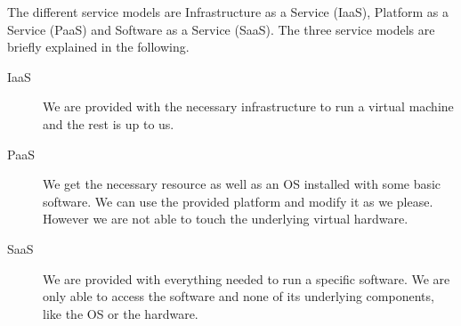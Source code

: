 The different service models are Infrastructure as a Service (IaaS),
Platform as a Service (PaaS) and Software as a Service (SaaS). The
three service models are briefly explained in the following.
\begin{description}

\item[IaaS] We are provided with the necessary
infrastructure to run a virtual machine and the rest is up to us.

\item[PaaS] We get the necessary resource as well as an OS
installed with some basic software. We can use the provided platform
and modify it as we please. However we are not able to touch the
underlying virtual hardware.

\item[SaaS] We are provided with everything needed to run a
specific software. We are only able to access the software and none of
its underlying components, like the OS or the hardware.

\end{description}

